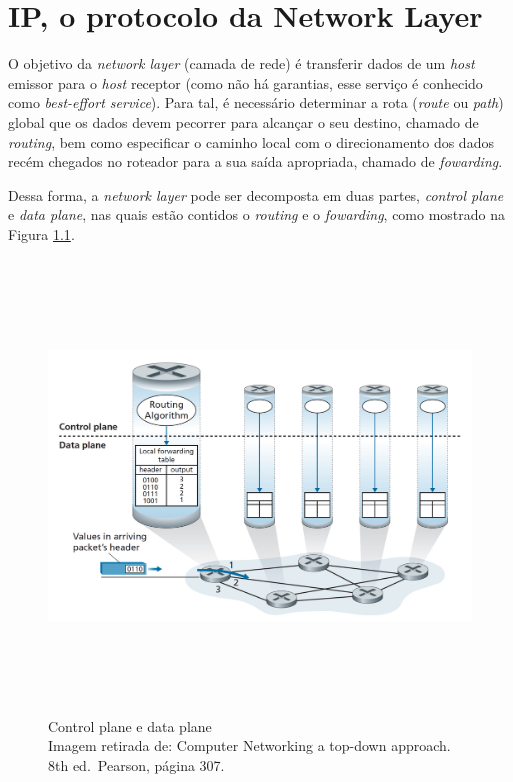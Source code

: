 



\hypertarget{ip-o-protocolo-da-network-layer}{%
\chapter{IP, o protocolo da Network Layer}\label{ip-o-protocolo-da-network-layer}}

O objetivo da \emph{network layer} (camada de rede) é transferir dados
de um \emph{host} emissor para o \emph{host} receptor (como não há
garantias, esse serviço é conhecido como \emph{best-effort service}).
Para tal, é necessário determinar a rota (\emph{route} ou \emph{path})
global que os dados devem pecorrer para alcançar o seu destino, chamado
de \emph{routing}, bem como especificar o caminho local com o
direcionamento dos dados recém chegados no roteador para a sua saída
apropriada, chamado de \emph{fowarding}.

Dessa forma, a \emph{network layer} pode ser decomposta em duas partes,
\emph{control plane} e \emph{data plane}, nas quais estão contidos o
\emph{routing} e o \emph{fowarding}, como mostrado na Figura \ref{Control plane e data plane}.

\begin{figure}[h!]
\centering
\includegraphics[keepaspectratio, width=15cm, height=12cm]{imagens/13/13 - Control plane and data plane.png}
\caption{Control plane e data plane \\
Imagem retirada de: Computer Networking a top-down approach. 8th
ed.~Pearson, página 307. \\}
\label{Control plane e data plane}
\end{figure}



